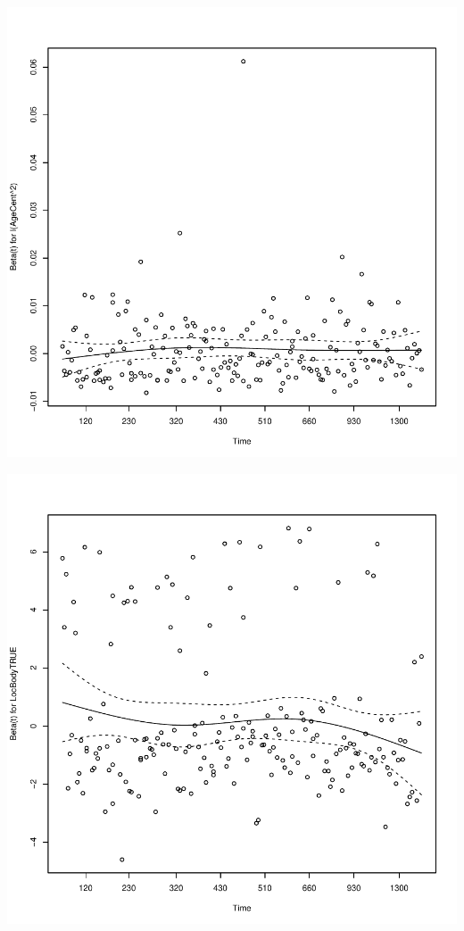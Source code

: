 \documentclass{article}\usepackage[]{graphicx}\usepackage[]{color}
\makeatletter
\def\maxwidth{ %
  \ifdim\Gin@nat@width>\linewidth
    \linewidth
  \else
    \Gin@nat@width
  \fi
}
\newenvironment{knitrout}{}{} %
\makeatother
\begin{document}
\begin{knitrout}
{}




{\centering \includegraphics[width=\maxwidth]{figure/eda-ph-check-full-3-2} 

}




{\centering \includegraphics[width=\maxwidth]{figure/eda-ph-check-full-3-3} 

}
\end{knitrout}
\end{document}
